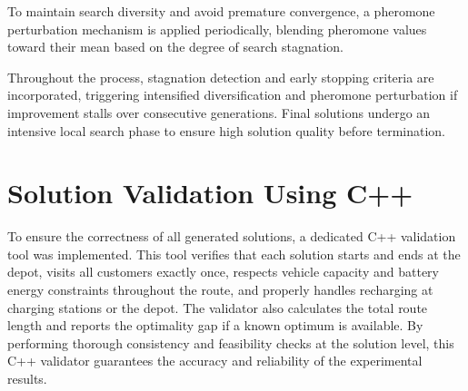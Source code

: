 To maintain search diversity and avoid premature convergence, a pheromone perturbation mechanism is applied periodically, blending pheromone values toward their mean based on the degree of search stagnation.

Throughout the process, stagnation detection and early stopping criteria are incorporated, triggering intensified diversification and pheromone perturbation if improvement stalls over consecutive generations.  
Final solutions undergo an intensive local search phase to ensure high solution quality before termination.

\section{Solution Validation Using C++}
\label{sec:cpp_validation}
To ensure the correctness of all generated solutions, a dedicated C++ validation tool was implemented.  
This tool verifies that each solution starts and ends at the depot, visits all customers exactly once, respects vehicle capacity and battery energy constraints throughout the route, and properly handles recharging at charging stations or the depot.  
The validator also calculates the total route length and reports the optimality gap if a known optimum is available.  
By performing thorough consistency and feasibility checks at the solution level, this C++ validator guarantees the accuracy and reliability of the experimental results.
